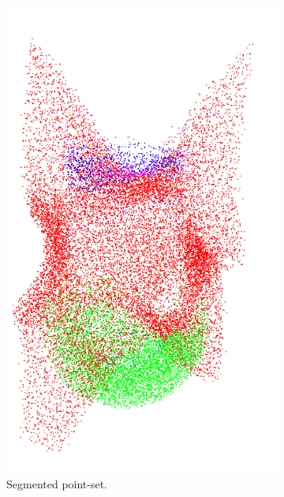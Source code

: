 \begin{figure}
	\centering
	\begin{subfigure}[b]{0.20\linewidth}
		\centering
		\includegraphics[width=\textwidth]{figures/m1_pc.png}
		\caption{Segmented point-set.}
	\end{subfigure}	 
	\begin{subfigure}[b]{0.25\linewidth}
		\centering

\end{subfigure}
\end{figure}
